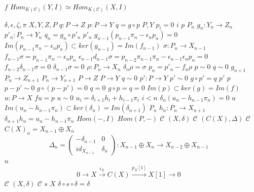 \documentclass{article}
\begin{document}
$f$
$Hom_{K(\mathcal{C})}(Y,I) \simeq Hom_{K(\mathcal{C})}(X,I)$
$\delta,\epsilon,\zeta,\pi$
$X,Y,Z,P$
$q:P \rightarrow Z$
$p:P \rightarrow Y$
$q=g \circ p$
$P,Y$
$p_i=0$
$i$
$p$
$P_n$
$g_n:Y_n \rightarrow Z_n$
$p'_n:P_n \rightarrow Y_n$
$q_n=g_n \circ p'_n$
$p'_n$
$g_{n-1}(p_{n-1}\pi_{n}-\epsilon_{n}p_{n})=0$
$Im(p_{n-1}\pi_n- \epsilon_np_n) \subset ker(g_{n-1})=Im(f_{n-1})$
$\sigma:P_n \rightarrow X_{n-1}$
$f_{n-1}\sigma=p_{n-1}\pi_n-\epsilon_{n}p_n$
$\epsilon_{n-1}d_{n-1}\sigma=p_{n-2}\pi_{n-1}\pi_{n}-\epsilon_{n-1}\epsilon_{n}p_n=0$
$f_{n-2}\delta_{n-1}\sigma=0$
$\delta_{n-1}\sigma=0$
$\rho:P_n \rightarrow X_n$
$\delta_n\rho=\sigma$
$p_n=p'_n-f_n\rho$
$p \sim 0$
$q \sim 0$
$g_{n+1}$
$P_n \rightarrow Z_{n+1}$
$P_n \rightarrow Y_{n+1}$
$P \rightarrow Z$
$P \rightarrow Y$
$q \sim 0$
$p':P \rightarrow Y$
$p' \sim 0$
$g \circ p'=q$
$p'$
$p$
$p-p' \sim 0$
$g \circ(p-p')=0$
$q=0$
$g \circ p=q=0$
$Im(p) \subset ker(g)=Im(f)$
$u:P \rightarrow X$
$fu=p$
$u \sim 0$
$u_i=\delta_{i+1}h_i+h_{i-1}\pi_i$
$i<n$
$\delta_n(u_n-h_{n-1}\pi_n)=0$
$u$
$Im(u_n-h_{n-1}\pi_n) \subset ker(\delta_n)=Im(\delta_{n+1})$
$P_n$
$h_n:P_n \rightarrow X_{n+1}$
$\delta_{n+1}h_n=u_n-h_{n-1}\pi_n$
$Hom(-,I)$
$Hom(P,-)$
$\mathcal{C}$
$(X,\delta)$
$\mathcal{C}$
$(C(X),\Delta)$
$\mathcal{C}$
$C(X)_n=X_{n-1} \oplus X_n$
$$\Delta_n= \begin{pmatrix}-\delta_{n-1} &0 \\ id_{X_{n-1}} & \delta_n\end{pmatrix}:X_{n-1} \oplus X_n \longrightarrow X_{n-2} \oplus X_{n-1}$$
$n$
$$0 \longrightarrow X \stackrel{i_X}{\longrightarrow} C(X) \stackrel{p_X[1]}{\longrightarrow} X[1] \longrightarrow 0$$
$\mathcal{C}$
$(X,\delta)$
$\mathcal{C}$
$s$
$X$
$\delta \circ s \circ \delta=\delta$
\end{document}
